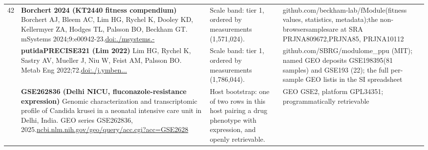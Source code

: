\begin{landscape}
\begin{longtable}{@{}r@{\hspace{4pt}} L{78mm} L{72mm} L{76mm}@{}}
42 & \textbf{Borchert 2024 (KT2440 fitness compendium)} \newline Borchert AJ, Bleem AC, Lim HG, Rychel K, Dooley KD, Kellermyer ZA, Hodges TL, Palsson BO, Beckham GT. mSystems 2024;9:e00942-23.\newline \href{https://doi.org/10.1128/msystems.00942-23}{doi:./\allowbreak msystem\allowbreak s.-} & Scale band: tier 1, ordered by measurements (1,571,024). & github.\allowbreak com/\allowbreak beckham\allowbreak -\allowbreak lab/\allowbreak fModule\allowbreak  (fitnes\allowbreak s values\allowbreak , statis\allowbreak tics, me\allowbreak tadata);\allowbreak  the non\allowbreak -\allowbreak browser\allowbreak  samples\allowbreak  are at \allowbreak SRA PRJN\allowbreak A809672,\allowbreak  PRJNA85, PR\allowbreak JNA10112 \\
 & \textbf{putidaPRECISE321 (Lim 2022)} \newline Lim HG, Rychel K, Sastry AV, Mueller J, Niu W, Feist AM, Palsson BO. Metab Eng 2022;72.\newline \href{https://doi.org/10.1016/j.ymben.2022.04.004}{doi:./\allowbreak j.\allowbreak ymben...} & Scale band: tier 1, ordered by measurements (1,786,044). & github.\allowbreak com/\allowbreak SBRG/\allowbreak modulom\allowbreak e\_\allowbreak ppu (MI\allowbreak T); name\allowbreak d GEO de\allowbreak posits G\allowbreak SE198395\allowbreak  (81 sam\allowbreak ples) an\allowbreak d GSE193 (22)\allowbreak ; the fu\allowbreak ll per-\allowbreak sample \allowbreak GEO list\allowbreak  is in t\allowbreak he SI sp\allowbreak readshee\allowbreak t \\
 & \textbf{GSE262836 (Delhi NICU, fluconazole-resistance expression)} \newline Genomic characterization and transcriptomic profile of Candida krusei in a neonatal intensive care unit in Delhi, India. GEO series GSE262836, 2025.\newline \href{https://www.ncbi.nlm.nih.gov/geo/query/acc.cgi?acc=GSE262836}{ncbi.\allowbreak nlm.\allowbreak nih.\allowbreak gov/\allowbreak geo/\allowbreak query/\allowbreak acc.\allowbreak cgi?\allowbreak acc=\allowbreak GSE2628} & Host bootstrap: one of two rows in this host pairing a drug phenotype with expression, and openly retrievable. & GEO GSE2, p\allowbreak latform \allowbreak GPL34351\allowbreak ; progra\allowbreak mmatical\allowbreak ly retri\allowbreak evable \\

\end{longtable}
\end{landscape}
